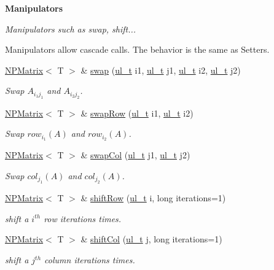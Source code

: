 \begin{Indent}\textbf{ Manipulators}\par
{\em Manipulators such as swap, shift...

Manipulators allow cascade calls. The behavior is the same as Setters. }\begin{DoxyCompactItemize}
\item 
\mbox{\hyperlink{class_n_p_matrix}{N\+P\+Matrix}}$<$ T $>$ \& \mbox{\hyperlink{class_n_p_matrix_a599031f0b0fd352a047f1e87c16e17c6}{swap}} (\mbox{\hyperlink{typedef_8h_a1b140a2034db3f5dfe18a987745df43a}{ul\+\_\+t}} i1, \mbox{\hyperlink{typedef_8h_a1b140a2034db3f5dfe18a987745df43a}{ul\+\_\+t}} j1, \mbox{\hyperlink{typedef_8h_a1b140a2034db3f5dfe18a987745df43a}{ul\+\_\+t}} i2, \mbox{\hyperlink{typedef_8h_a1b140a2034db3f5dfe18a987745df43a}{ul\+\_\+t}} j2)
\begin{DoxyCompactList}\small\item\em Swap $ A_{i_1j_1} $ and $ A_{i_2j_2} $. \end{DoxyCompactList}\item 
\mbox{\hyperlink{class_n_p_matrix}{N\+P\+Matrix}}$<$ T $>$ \& \mbox{\hyperlink{class_n_p_matrix_a85b764f2c21bce5c913c5e0aabb026a1}{swap\+Row}} (\mbox{\hyperlink{typedef_8h_a1b140a2034db3f5dfe18a987745df43a}{ul\+\_\+t}} i1, \mbox{\hyperlink{typedef_8h_a1b140a2034db3f5dfe18a987745df43a}{ul\+\_\+t}} i2)
\begin{DoxyCompactList}\small\item\em Swap $ row_{i_1}(A) $ and $ row_{i_2}(A) $. \end{DoxyCompactList}\item 
\mbox{\hyperlink{class_n_p_matrix}{N\+P\+Matrix}}$<$ T $>$ \& \mbox{\hyperlink{class_n_p_matrix_a0df10f5717511bc15429955244b83ea1}{swap\+Col}} (\mbox{\hyperlink{typedef_8h_a1b140a2034db3f5dfe18a987745df43a}{ul\+\_\+t}} j1, \mbox{\hyperlink{typedef_8h_a1b140a2034db3f5dfe18a987745df43a}{ul\+\_\+t}} j2)
\begin{DoxyCompactList}\small\item\em Swap $ col_{j_1}(A) $ and $ col_{j_2}(A) $. \end{DoxyCompactList}\item 
\mbox{\hyperlink{class_n_p_matrix}{N\+P\+Matrix}}$<$ T $>$ \& \mbox{\hyperlink{class_n_p_matrix_a8927e2dc64af30c6f619a93678332093}{shift\+Row}} (\mbox{\hyperlink{typedef_8h_a1b140a2034db3f5dfe18a987745df43a}{ul\+\_\+t}} i, long iterations=1)
\begin{DoxyCompactList}\small\item\em shift a $ i^{th} $ row iterations times. \end{DoxyCompactList}\item 
\mbox{\hyperlink{class_n_p_matrix}{N\+P\+Matrix}}$<$ T $>$ \& \mbox{\hyperlink{class_n_p_matrix_ae039695bf1464be6563f81d6e0c502d8}{shift\+Col}} (\mbox{\hyperlink{typedef_8h_a1b140a2034db3f5dfe18a987745df43a}{ul\+\_\+t}} j, long iterations=1)
\begin{DoxyCompactList}\small\item\em shift a $ j^{th} $ column iterations times. \end{DoxyCompactList}\end{DoxyCompactItemize}
\end{Indent}
